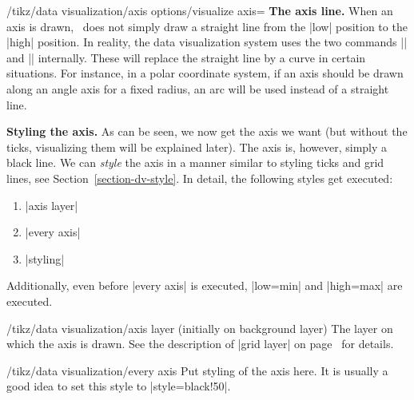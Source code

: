 \begin{key}{/tikz/data visualization/axis options/visualize axis=}
    \medskip
    \textbf{The axis line.}
    When an axis is drawn, \tikzname\ does not simply draw a straight line from the |low| position to the |high| position. In reality, the data visualization system uses the two commands |\pgfpathdvmoveto| and |\pgfpathdvlineto| internally. These will replace the straight line by a curve in certain situations. For instance, in a polar coordinate system, if an axis should be drawn along an angle axis for a fixed radius, an arc will be used instead of a straight line.


    \medskip
    \textbf{Styling the axis.}
    As can be seen, we now get the axis we want (but without the ticks, visualizing them will be explained later). The axis is, however, simply a black line. We can \emph{style} the axis in a manner similar to styling ticks and grid lines, see Section~\ref{section-dv-style}. In detail, the following styles get executed:
    \begin{enumerate}
        \item |axis layer|
        \item |every axis|
        \item |styling|
    \end{enumerate}
    Additionally, even before |every axis| is executed, |low=min| and
    |high=max| are executed.

    \begin{stylekey}{/tikz/data visualization/axis layer (initially on background layer)}
        The layer on which the axis is drawn. See the description of |grid layer| on page~\pageref{section-dv-grid-layer} for details.
    \end{stylekey}

    \begin{stylekey}{/tikz/data visualization/every axis}
        Put styling of the axis here. It is usually a good idea to set this style to |style={black!50}|.
    \end{stylekey}


\end{key}
